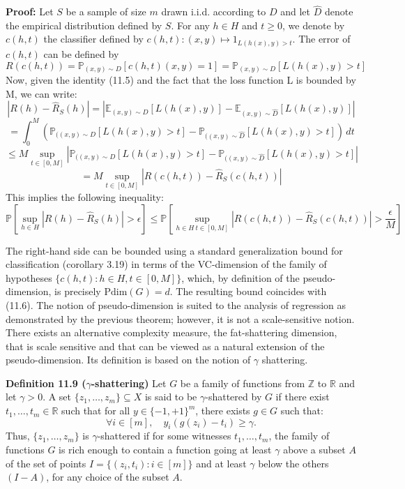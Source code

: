 \documentclass[fleqn,10pt]{olplainarticle}
\begin{document}
\textbf{Proof:} Let \(S\) be a sample of size \(m\) drawn i.i.d. according to \(D\) and let \(\hat{D}\) denote the empirical distribution defined by \(S\). For any \(h \in H\) and \(t \geq 0\), we denote by \(c(h, t)\) the classifier defined by \(c(h, t):(x, y) \mapsto 1_{L(h(x),y) > t}\). The error of \(c(h, t)\) can be defined by
\[
R(c(h, t)) = \mathbb{P}_{(x,y) \sim D} [c(h, t)(x, y) = 1] = \mathbb{P}_{(x,y) \sim D} [L(h(x), y) > t]
\]
Now, given the identity (11.5) and the fact that the loss function L is bounded by M, we can write:
\[
\left| R(h) - \widehat{R}_S(h) \right| =
\left| \mathbb{E}_{(x,y) \sim D} \left[ L(h(x), y) \right] - \mathbb{E}_{(x,y) \sim \widehat{D}} \left[ L(h(x), y) \right] \right|
\]
\[
= \int_{0}^{M} \left( \mathbb{P}_{( (x,y) \sim D} [L(h(x), y) > t] - \mathbb{P}_{( (x,y) \sim \widehat{D}} [L(h(x), y) > t] \right) \, dt
\]
\[
\leq M \sup_{t \in [0,M]} \left| \mathbb{P}_{( (x,y) \sim D} [L(h(x), y) > t]  - \mathbb{P}_{( (x,y) \sim \widehat{D}} [L(h(x), y) > t]  \right|
\]
\[
= M \sup_{t \in [0,M]} \left| R(c(h, t)) - \widehat{R}_S (c(h, t)) \right|
\]
This implies the following inequality:
\[
\mathbb{P} \left[ \sup_{h \in H} \left| R(h) - \widehat{R}_S(h) \right| > \epsilon \right]
\leq \mathbb{P} \left[ \sup_{h \in H \ t \in [0,M]} \left| R(c(h, t)) - \widehat{R}_S(c(h, t)) \right| > \frac{\epsilon}{M} \right]
\]


The right-hand side can be bounded using a standard generalization bound for classification (corollary 3.19) in terms of the VC-dimension of the family of hypotheses $\{c(h, t) : h \in H, t \in [0, M]\}$, which, by definition of the pseudo-dimension, is precisely $\text{Pdim}(G) = d$. The resulting bound coincides with (11.6). The notion of pseudo-dimension is suited to the analysis of regression as demonstrated by the previous theorem; however, it is not a scale-sensitive notion. There exists an alternative complexity measure, the fat-shattering dimension, that is scale sensitive and that can be viewed as a natural extension of the pseudo-dimension. Its definition is based on the notion of $\gamma$ shattering.

\textbf{Definition 11.9 ($\gamma$-shattering)}
Let \(G\) be a family of functions from \(\mathbb{Z}\) to \(\mathbb{R}\) and let \(\gamma > 0\).
A set \(\{z_1, \ldots, z_m\} \subseteq X\) is said to be \(\gamma\)-shattered by \(G\) if there exist \(t_1, \ldots, t_m \in \mathbb{R}\) such that for all \(y \in \{-1, +1\}^m\), there exists \(g \in G\) such that:
\[
\forall i \in [m], \quad y_i(g(z_i) - t_i) \geq \gamma.
\]
Thus, \(\{z_1, \ldots, z_m\}\) is \(\gamma\)-shattered if for some witnesses \(t_1, \ldots, t_m\), the family of functions \(G\) is rich enough to contain a function going at least \(\gamma\) above a subset \(A\) of the set of points \(I = \{(z_i, t_i) : i \in [m]\}\) and at least \(\gamma\) below the others \((I - A)\), for any choice of the subset \(A\).
\end{document}
